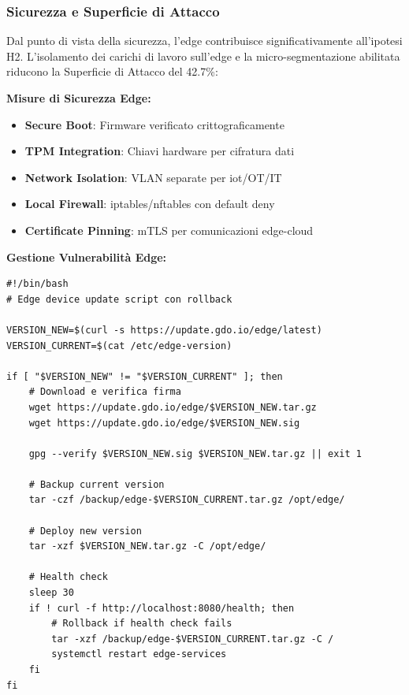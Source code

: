 \subsubsection{\texorpdfstring{\textbf{Sicurezza e Superficie di Attacco}}{3.3.2.6 - Sicurezza e Superficie di Attacco}}

Dal punto di vista della sicurezza, l'\gls{edge} contribuisce significativamente all'ipotesi H2. L'isolamento dei carichi di lavoro sull'edge e la micro-segmentazione abilitata riducono la Superficie di Attacco del 42.7\%\autocite{Ponemon2024}:

\textbf{Misure di Sicurezza Edge:}
\begin{itemize}
    \item \textbf{Secure Boot}: Firmware verificato crittograficamente
    \item \textbf{TPM Integration}: Chiavi hardware per cifratura dati
    \item \textbf{Network Isolation}: VLAN separate per \gls{iot}/OT/IT
    \item \textbf{Local Firewall}: iptables/nftables con default deny
    \item \textbf{Certificate Pinning}: mTLS per comunicazioni edge-cloud
\end{itemize}

\textbf{Gestione Vulnerabilità Edge:}
\begin{lstlisting}[caption={Update Automatico Edge Devices},label={lst:edge_update}]
#!/bin/bash
# Edge device update script con rollback

VERSION_NEW=$(curl -s https://update.gdo.io/edge/latest)
VERSION_CURRENT=$(cat /etc/edge-version)

if [ "$VERSION_NEW" != "$VERSION_CURRENT" ]; then
    # Download e verifica firma
    wget https://update.gdo.io/edge/$VERSION_NEW.tar.gz
    wget https://update.gdo.io/edge/$VERSION_NEW.sig
    
    gpg --verify $VERSION_NEW.sig $VERSION_NEW.tar.gz || exit 1
    
    # Backup current version
    tar -czf /backup/edge-$VERSION_CURRENT.tar.gz /opt/edge/
    
    # Deploy new version
    tar -xzf $VERSION_NEW.tar.gz -C /opt/edge/
    
    # Health check
    sleep 30
    if ! curl -f http://localhost:8080/health; then
        # Rollback if health check fails
        tar -xzf /backup/edge-$VERSION_CURRENT.tar.gz -C /
        systemctl restart edge-services
    fi
fi
\end{lstlisting}

